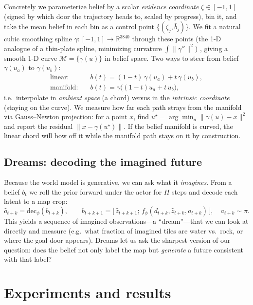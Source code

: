 \documentclass[11pt]{article}
\newcommand{\R}{\mathbb{R}}
\begin{document}
Concretely we parameterize belief by a scalar \emph{evidence coordinate}
$\zeta\in[-1,1]$ (signed by which door the trajectory heads to, scaled by
progress), bin it, and take the mean belief in each bin as a control point
$\{(\zeta_j, \bar b_j)\}$. We fit a natural cubic smoothing spline
$\gamma:[-1,1]\to\R^{3840}$ through these points (the 1-D analogue of a
thin-plate spline, minimizing curvature $\int\|\gamma''\|^2$)
\cite{reinsch1967smoothing}, giving a smooth 1-D curve $\mathcal{M}=\{\gamma(u)\}$
in belief space. Two ways to steer from belief $\gamma(u_a)$ to $\gamma(u_b)$:
\begin{align}
\text{linear:}\quad & b(t) = (1-t)\,\gamma(u_a) + t\,\gamma(u_b), \\
\text{manifold:}\quad & b(t) = \gamma\big((1-t)u_a + t\,u_b\big),
\end{align}
i.e.\ interpolate in \emph{ambient space} (a chord) versus in the \emph{intrinsic
coordinate} (staying on the curve). We measure how far each path strays from the
manifold via Gauss--Newton projection: for a point $x$, find
$u^\star=\arg\min_u\|\gamma(u)-x\|^2$ and report the residual
$\|x-\gamma(u^\star)\|$. If the belief manifold is curved, the linear chord will
bow off it while the manifold path stays on it by construction.

\subsection{Dreams: decoding the imagined future}
\label{sec:dreams}
Because the world model is generative, we can ask what it \emph{imagines}. From a
belief $b_t$ we roll the prior forward under the actor for $H$ steps and decode
each latent to a map crop:
\begin{equation}
\hat o_{t+k} = \mathrm{dec}_\phi(b_{t+k}), \qquad
b_{t+k+1} = \big[\,\hat z_{t+k+1};\,f_\phi(d_{t+k}, \hat z_{t+k}, a_{t+k})\,\big],\quad a_{t+k}\sim\pi.
\end{equation}
This yields a sequence of imagined observations---a ``dream''---that we can look
at directly and measure (e.g.\ what fraction of imagined tiles are water vs.\
rock, or where the goal door appears). Dreams let us ask the sharpest version of
our question: does the belief not only label the map but \emph{generate} a future
consistent with that label?

\section{Experiments and results}
\label{sec:experiments}
\end{document}
